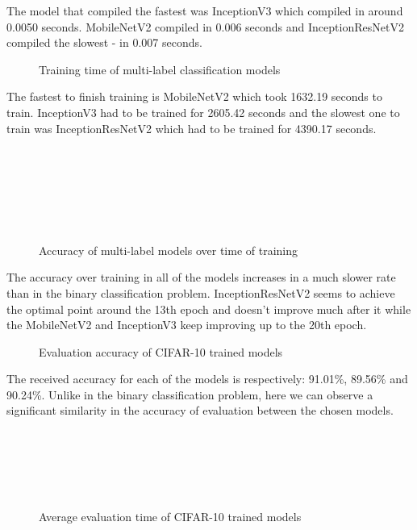 \documentclass{ijisa}
\begin{document}
The model that compiled the fastest was InceptionV3 which compiled in around 0.0050 seconds. MobileNetV2 compiled in 0.006 seconds and InceptionResNetV2 compiled the slowest - in 0.007 seconds.

\begin{figure}[!h]
\centering
\scalebox{0.5}{}
\caption{Training time of multi-label classification models} \label{fig:fig7}
\end{figure}

The fastest to finish training is MobileNetV2 which took 1632.19 seconds to train. InceptionV3 had to be trained for 2605.42 seconds and the slowest one to train was InceptionResNetV2 which had to be trained for 4390.17 seconds.\\\\\\\\\\\\\\

\begin{figure}[!h]
\centering
\scalebox{0.5}{}
\caption{Accuracy of multi-label models over time of training} \label{fig:fig8}
\end{figure}

The accuracy over training in all of the models increases in a much slower rate than in the binary classification problem. InceptionResNetV2 seems to achieve the optimal point around the 13th epoch and doesn't improve much after it while the MobileNetV2 and InceptionV3 keep improving up to the 20th epoch.

\begin{figure}[!h]
\centering
\scalebox{0.5}{}
\caption{Evaluation accuracy of CIFAR-10 trained models} \label{fig:fig9}
\end{figure}

The received accuracy for each of the models is respectively: 91.01\%, 89.56\% and 90.24\%. Unlike in the binary classification problem, here we can observe a significant similarity in the accuracy of evaluation between the chosen models.\\\\\\\\\\\\

\begin{figure}[!h]
\centering
\scalebox{0.5}{}
\caption{Average evaluation time of CIFAR-10 trained models} \label{fig:fig10}
\end{figure}
\end{document}
